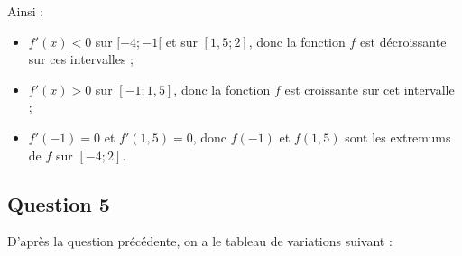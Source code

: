 \documentclass[10pt]{article}
\providecommand{\e}{{\mathrm{e}}}
\begin{document}
Ainsi :
\begin{itemize}
	\item $f'(x) < 0$ sur $[-4 ; -1[$ et sur $[1,5 ; 2]$, donc la fonction $f$ est décroissante sur ces intervalles ;
	\item $f'(x) > 0$ sur $[-1 ; 1,5]$, donc la fonction $f$ est croissante sur cet intervalle ;
	\item $f'(-1) = 0$ et $f'(1,5) = 0$, donc $f(-1)$ et $f(1,5)$ sont les extremums de $f$ sur $[-4 ; 2]$.
\end{itemize}

\subsection*{Question 5}

D'après la question précédente, on a le tableau de variations suivant :

\begin{center}
\end{center}
\end{document}
